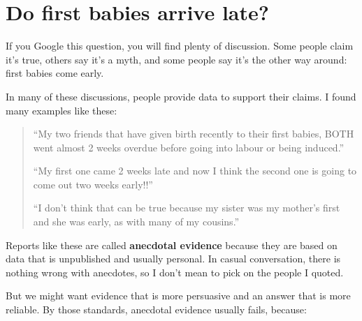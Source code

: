 \documentclass[12pt]{book}
\begin{document}
\section{Do first babies arrive late?}

If you Google this question, you will find plenty of discussion.
Some people claim it's true, others say it's a myth, and some people
say it's the other way around: first babies come early.

In many of these discussions, people provide data to support their
claims.  I found many examples like these:

\begin{quote}

``My two friends that have given birth recently to their first babies,
BOTH went almost 2 weeks overdue before going into labour or being
induced.''

``My first one came 2 weeks late and now I think the second one is
going to come out two weeks early!!''

``I don't think that can be true because my sister was my mother's
first and she was early, as with many of my cousins.''

\end{quote}

Reports like these are called {\bf anecdotal evidence} because they
are based on data that is unpublished and usually personal.  In casual
conversation, there is nothing wrong with anecdotes, so I don't mean
to pick on the people I quoted.


But we might want evidence that is more persuasive and
an answer that is more reliable.  By those standards, anecdotal
evidence usually fails, because:
\end{document}
